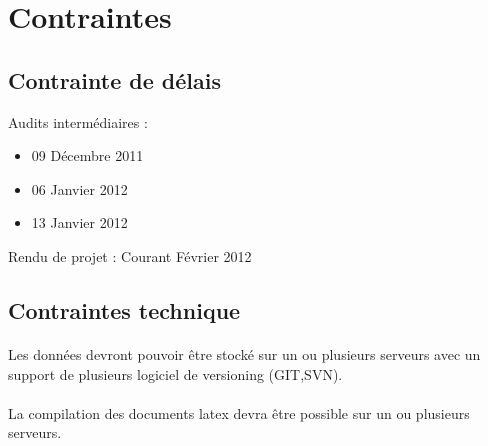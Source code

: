\documentclass[a4paper,12pt]{article}
\begin{document}
 	


\section{Contraintes}

\subsection{Contrainte de délais}

Audits intermédiaires :
\begin{itemize}
 \item 09 Décembre 2011
 \item 06 Janvier 2012
 \item 13 Janvier 2012
\end{itemize}

Rendu de projet : Courant Février 2012

\subsection{Contraintes technique}
 	
\paragraph*{}
Les données devront pouvoir être stocké sur un ou plusieurs serveurs avec un support de plusieurs logiciel de versioning (GIT,SVN).

\paragraph*{}
La compilation des documents latex devra être possible sur un ou plusieurs serveurs.
\end{document}
